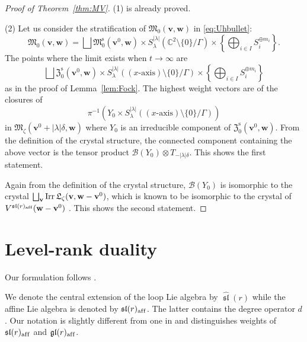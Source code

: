 \documentclass[pdftex]{sigma}
\theoremstyle{definition}
\numberwithin{equation}{section}
\newcommand{\thmref}[1]{Theorem~\ref{#1}}
\newcommand{\lemref}[1]{Lemma~\ref{#1}}
\newcommand{\C}{{\mathbb C}}
\newcommand{\algsl}{\operatorname{\mathfrak{sl}}} %
\newcommand{\gl}{\operatorname{\mathfrak{gl}}}
\newcommand{\M}{{\mathfrak M}} %
\newcommand{\Mreg}{\M^{\operatorname{s}}}
\newcommand{\La}{{\mathfrak L}} %
\newcommand{\bv}{{\mathbf v}} %
\newcommand{\bw}{{\mathbf w}} %
\newcommand{\Irr}{\operatorname{Irr}}
\newcommand{\aff}{\mathrm{af\/f}}
\begin{document}
\begin{proof}[Proof of \thmref{thm:MV}]
(1) is already proved.

(2) Let us consider the stratif\/ication of
$\M_0(\bv,\bw)$ in \eqref{eq:Uhbullet}:
\begin{equation*}
  \M_0(\bv,\bw) = \bigsqcup
  \Mreg_0(\bv^0,\bw)
  \times S^{|\lambda|}_\lambda(\C^2\setminus\{0\}/\Gamma)
  \times \left\{
    \bigoplus_{i\in I} S_i^{\oplus m_i}
    \right\}.
\end{equation*}
The points where the limit exists when $t\to \infty$ are
\begin{equation*}
  \bigsqcup
  \mathfrak Z^{\operatorname{s}}_0(\bv^0,\bw)
  \times S^{|\lambda|}_\lambda((\text{$x$-axis})\setminus\{0\}/\Gamma)
  \times \left\{
    \bigoplus_{i\in I} S_i^{\oplus m_i}
    \right\}
\end{equation*}
as in the proof of \lemref{lem:Fock}. The highest weight vectors are
of the closures of
\begin{equation*}
   \pi^{-1}(
   Y_0 \times
   S^{|\lambda|}_\lambda((\text{$x$-axis})\setminus\{0\}/\Gamma))
\end{equation*}
in $\M_\zeta(\bv^0+|\lambda|\delta,\bw)$ where $Y_0$ is an irreducible
component of $\mathfrak Z^{\operatorname{s}}_0(\bv^0,\bw)$.
%
From the def\/inition of the crystal structure, the connected component
containing the above vector is the tensor product
\(
   \mathscr B(Y_0) \otimes T_{-|\lambda|\delta}.
\)
This shows the f\/irst statement.

Again from the def\/inition of the crystal structure, $\mathscr B(Y_0)$
is isomorphic to the crystal $\bigsqcup_\bv \linebreak[3]\Irr\La_\zeta(\bv,\bw -
\bv^0)$, which is known to be isomorphic to the crystal of
$V^{\algsl(r)_\aff}(\bw - \bv^0)$ \cite{KS,Saito,Na-tensor}. This shows
  the second statement.
\end{proof}

\appendix
\section{Level-rank duality}\label{sec:level-rank}

Our formulation follows \cite{Hasegawa,NT}.

We denote the central extension of the loop Lie algebra by
$\widehat{\algsl}(r)$ while the af\/f\/ine Lie algebra is denoted by
$\algsl(r)_\aff$. The latter contains the degree operator $d$. Our
notation is slightly dif\/ferent from one in \cite{braverman-2007} and
distinguishes weights of $\algsl(r)_\aff$ and $\gl(r)_\aff$.
\end{document}
